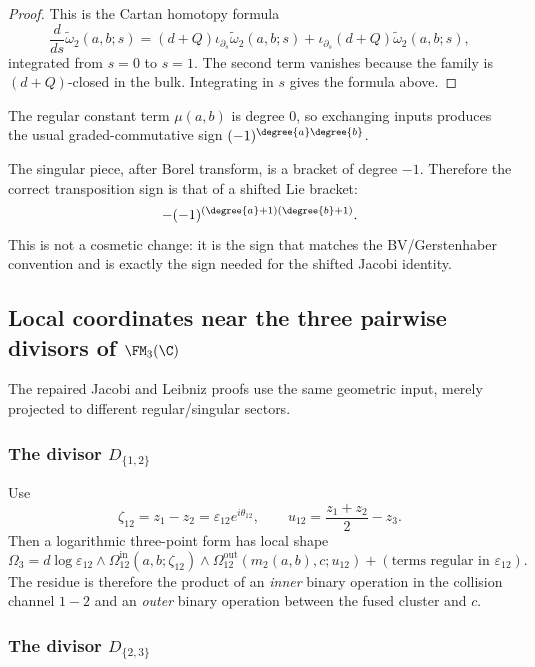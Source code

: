 \begin{proof}
This is the Cartan homotopy formula
\[
\frac{d}{ds}\widetilde\omega_2(a,b;s)
=
(d+Q)\iota_{\partial_s}\widetilde\omega_2(a,b;s)
+
\iota_{\partial_s}(d+Q)\widetilde\omega_2(a,b;s),
\]
integrated from $s=0$ to $s=1$.  The second term vanishes because the family is
$(d+Q)$-closed in the bulk.  Integrating in $s$ gives the formula above.
\end{proof}

\begin{remark}
The regular constant term $\mu(a,b)$ is degree $0$, so exchanging inputs produces the
usual graded-commutative sign $(-1)^{\degree{a}\degree{b}}$.

The singular piece, after Borel transform, is a bracket of degree $-1$.  Therefore the
correct transposition sign is that of a shifted Lie bracket:
\[
-(-1)^{(\degree{a}+1)(\degree{b}+1)}.
\]
This is not a cosmetic change: it is the sign that matches the BV/Gerstenhaber
convention and is exactly the sign needed for the shifted Jacobi identity.
\end{remark}

\subsection{Local coordinates near the three pairwise divisors of $\FM_3(\C)$}

The repaired Jacobi and Leibniz proofs use the same geometric input, merely projected
to different regular/singular sectors.

\subsubsection*{The divisor $D_{\{1,2\}}$}

Use
\[
\zeta_{12}=z_1-z_2=\varepsilon_{12}e^{i\theta_{12}},
\qquad
u_{12}=\frac{z_1+z_2}{2}-z_3.
\]
Then a logarithmic three-point form has local shape
\begin{equation}
\label{eq:local-D12}
\Omega_3
=
d\log\varepsilon_{12}\wedge
\Omega_{12}^{\mathrm{in}}(a,b;\zeta_{12})
\wedge
\Omega_{12}^{\mathrm{out}}(m_2(a,b),c;u_{12})
+
(\text{terms regular in }\varepsilon_{12}).
\end{equation}
The residue is therefore the product of an \emph{inner} binary operation in the
collision channel $1\!-\!2$ and an \emph{outer} binary operation between the fused
cluster and $c$.

\subsubsection*{The divisor $D_{\{2,3\}}$}


